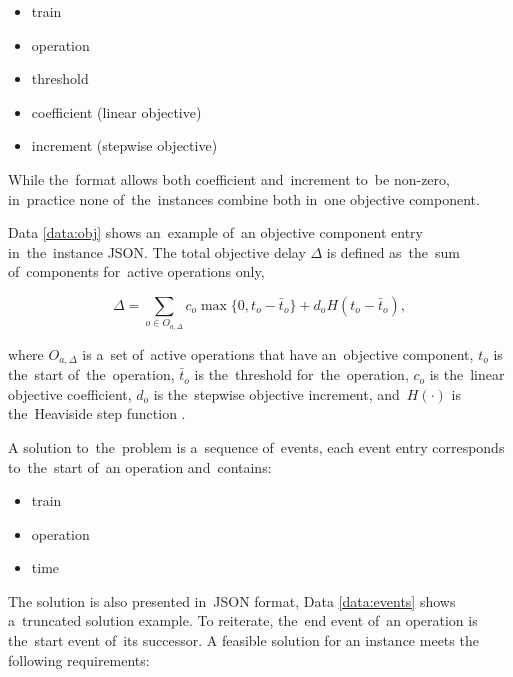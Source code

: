 \begin{itemize}
    \item train
    \item operation
    \item threshold
    \item coefficient (linear objective)
    \item increment (stepwise objective)
\end{itemize}

\begin{remark}
While the~format allows both coefficient and~increment to~be non-zero, in~practice none of~the~instances combine both in~one objective component.
\end{remark}

\newpage
Data \ref{data:obj} shows an~example of~an objective component entry in~the~instance JSON. The total objective delay $\Delta$ is defined as~the~sum of~components for~active operations only,

\begin{equation}
\Delta = \sum_{o \in O_{a,\Delta}} c_o \max\{0, t_o - \bar{t}_o\} + d_o H(t_o - \bar{t}_o),
\end{equation}

where $O_{a,\Delta}$ is a~set of~active operations that have an~objective component, $t_o$ is the~start of~the~operation, $\bar{t}_o$ is the~threshold for~the~operation, $c_o$ is the~linear objective coefficient, $d_o$ is the~stepwise objective increment, and~$H(\cdot)$ is the~Heaviside step function \cite{abramowitz1972handbook}.

A solution to~the~problem is a~sequence of~events, each event entry corresponds to~the~start of~an operation and~contains:
\begin{itemize}
    \item train
    \item operation
    \item time
\end{itemize}

The solution is also presented in~JSON format, Data \ref{data:events} shows a~truncated solution example. To reiterate, the~end event of~an operation is the~start event of~its successor. A feasible solution for an instance meets the following requirements:

